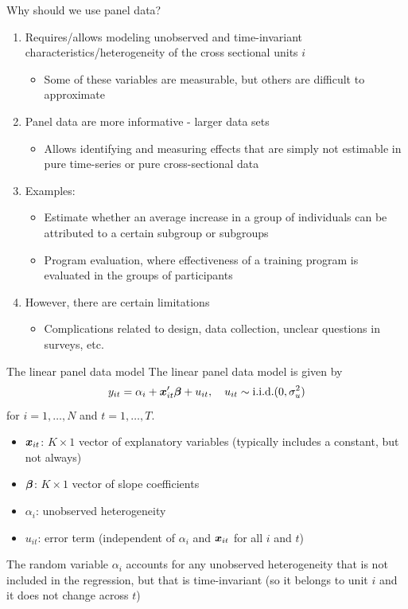 \documentclass[english, professionalfonts,smaller,xcolor=dvipsnames]{beamer}
\begin{document}
\begin{frame}{Why should we use panel data?}
\begin{enumerate}
\item[$\Rightarrow$] Requires/allows modeling unobserved and time-invariant characteristics/heterogeneity of the cross sectional units $i$
\begin{itemize}
\item Some of these variables are measurable, but others are difficult to approximate
\end{itemize}
\item[$\Rightarrow$] Panel data are more informative - larger data sets
\begin{itemize}
\item Allows identifying and measuring effects that are simply not estimable in pure time-series or pure cross-sectional data
\end{itemize}
\item[$\Rightarrow$] Examples:
\begin{itemize}
\item Estimate whether an average increase in a group of individuals can be attributed to a certain subgroup or subgroups
\item Program evaluation, where effectiveness of a training program is evaluated in the groups of participants
\end{itemize}
\item[$\Rightarrow$] However, there are certain limitations
\begin{itemize}
\item Complications related to design, data collection, unclear questions in surveys, etc.
\end{itemize}
\end{enumerate}
\end{frame}

\begin{frame}{The linear panel data model}
The linear panel data model is given by
$$
y_{it} = \alpha_i+\bm x_{it}'\bm \beta+u_{it}, \quad
u_{it} \sim \text{i.i.d.}(0,\sigma_u^2)
$$
for $i=1,\ldots,N$ and $t=1,\ldots,T$.
\begin{itemize}
\item $\bm x_{it}$: $K\times 1$ vector of explanatory variables (typically includes a constant, but not always)
\item $\bm \beta$: $K\times 1$ vector of slope coefficients
\item $\alpha_i$: unobserved heterogeneity
\item $u_{it}$: error term (independent of $\alpha_i$ and $\bm x_{it}$ for all $i$ and  $t$)
\end{itemize}
The random variable $\alpha_{i}$ accounts for any unobserved heterogeneity that is not included in the regression, but that is time-invariant (so it belongs to unit $i$ and it does not change across $t$)
\end{frame}
\end{document}
